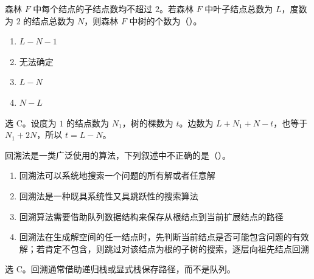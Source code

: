 \begin{question}
森林 $F$ 中每个结点的子结点数均不超过 $2$。若森林 $F$ 中叶子结点总数为 $L$，度数为 $2$ 的结点总数为 $N$，则森林 $F$ 中树的个数为（\quad）。
\begin{enumerate}
  \item $L-N-1$
  \item 无法确定
  \item $L-N$
  \item $N-L$
\end{enumerate}
\begin{solution}
选 C。设度为 $1$ 的结点数为 $N_1$，树的棵数为 $t$。边数为 $L+N_1+N-t$，也等于 $N_1+2N$，所以 $t=L-N$。
\end{solution}
\end{question}

\begin{question}
回溯法是一类广泛使用的算法，下列叙述中不正确的是（\quad）。
\begin{enumerate}
  \item 回溯法可以系统地搜索一个问题的所有解或者任意解
  \item 回溯法是一种既具系统性又具跳跃性的搜索算法
  \item 回溯算法需要借助队列数据结构来保存从根结点到当前扩展结点的路径
  \item 回溯法在生成解空间的任一结点时，先判断当前结点是否可能包含问题的有效解；若肯定不包含，则跳过对该结点为根的子树的搜索，逐层向祖先结点回溯
\end{enumerate}
\begin{solution}
选 C。回溯通常借助递归栈或显式栈保存路径，而不是队列。
\end{solution}
\end{question}

